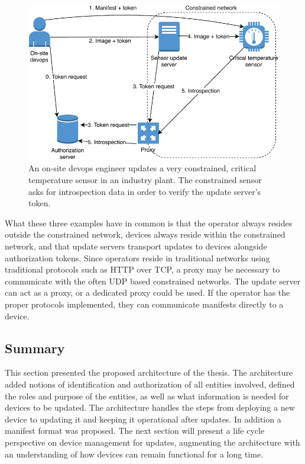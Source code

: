 \documentclass[0-thesis.tex]{subfiles}
\begin{document}
\begin{figure}[t]
    \caption{An on-site devops engineer updates a very constrained, critical temperature
                sensor in an industry plant. The constrained sensor asks for introspection
                data in order to verify the update server's token.}
    \label{fig:industry}
    \includegraphics{images/use-case-industry.pdf}
\end{figure}

What these three examples have in common is that the operator always resides outside the
constrained network, devices always reside within the constrained network, and that update
servers transport updates to devices alongside authorization tokens. Since operators
reside in traditional networks using traditional protocols such as HTTP over TCP, a proxy
may be necessary to communicate with the often UDP based constrained networks. The update
server can act as a proxy, or a dedicated proxy could be used. If the operator has the
proper protocols implemented, they can communicate manifests directly to a device.

\subsection{Summary}
\label{ssec:architecture-summary}
This section presented the proposed architecture of the thesis. The architecture added
notions of identification and authorization of all entities involved, defined the roles
and purpose of the entities, as well as what information is needed for devices to be
updated. The architecture handles the steps from deploying a new device to updating it and
keeping it operational after updates. In addition a manifest format was proposed. The next
section will present a life cycle perspective on device management for updates, augmenting
the architecture with an understanding of how devices can remain functional for a long
time.
\end{document}

